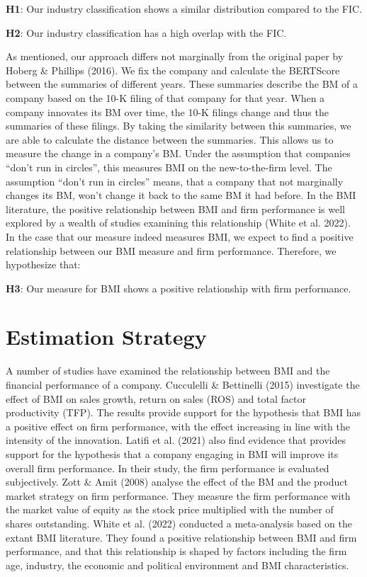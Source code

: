 \documentclass[
]{article}
\begin{document}
\textbf{H1}: Our industry classification shows a similar distribution
compared to the FIC.

\textbf{H2}: Our industry classification has a high overlap with the
FIC.

As mentioned, our approach differs not marginally from the original
paper by Hoberg \& Phillips (2016). We fix the company and calculate the
BERTScore between the summaries of different years. These summaries
describe the BM of a company based on the 10-K filing of that company
for that year. When a company innovates its BM over time, the 10-K
filings change and thus the summaries of these filings. By taking the
similarity between this summaries, we are able to calculate the distance
between the summaries. This allows us to measure the change in a
company's BM. Under the assumption that companies ``don't run in
circles'', this measures BMI on the new-to-the-firm level. The
assumption ``don't run in circles'' means, that a company that not
marginally changes its BM, won't change it back to the same BM it had
before. In the BMI literature, the positive relationship between BMI and
firm performance is well explored by a wealth of studies examining this
relationship (White et al. 2022). In the case that our measure indeed
measures BMI, we expect to find a positive relationship between our BMI
measure and firm performance. Therefore, we hypothesize that:

\textbf{H3}: Our measure for BMI shows a positive relationship with firm
performance.

\section{Estimation Strategy}\label{estimation-strategy}

A number of studies have examined the relationship between BMI and the
financial performance of a company. Cucculelli \& Bettinelli (2015)
investigate the effect of BMI on sales growth, return on sales (ROS) and
total factor productivity (TFP). The results provide support for the
hypothesis that BMI has a positive effect on firm performance, with the
effect increasing in line with the intensity of the innovation. Latifi
et al. (2021) also find evidence that provides support for the
hypothesis that a company engaging in BMI will improve its overall firm
performance. In their study, the firm performance is evaluated
subjectively. Zott \& Amit (2008) analyse the effect of the BM and the
product market strategy on firm performance. They measure the firm
performance with the market value of equity as the stock price
multiplied with the number of shares outstanding. White et al. (2022)
conducted a meta-analysis based on the extant BMI literature. They found
a positive relationship between BMI and firm performance, and that this
relationship is shaped by factors including the firm age, industry, the
economic and political environment and BMI characteristics.
\end{document}
